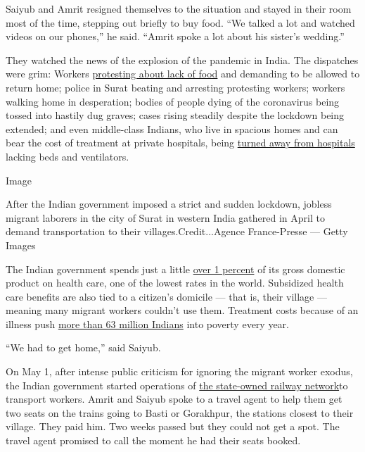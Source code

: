 Saiyub and Amrit resigned themselves to the situation and stayed in
their room most of the time, stepping out briefly to buy food. ``We
talked a lot and watched videos on our phones,'' he said. ``Amrit spoke
a lot about his sister's wedding.''

They watched the news of the explosion of the pandemic in India. The
dispatches were grim: Workers
\href{https://www.thehindu.com/news/national/other-states/migrant-workers-in-surat-take-to-the-streets-again/article31341846.ece}{protesting
about lack of food} and demanding to be allowed to return home; police
in Surat beating and arresting protesting workers; workers walking home
in desperation; bodies of people dying of the coronavirus being tossed
into hastily dug graves; cases rising steadily despite the lockdown
being extended; and even middle-class Indians, who live in spacious
homes and can bear the cost of treatment at private hospitals, being
\href{https://www.nytimes3xbfgragh.onion/2020/06/21/world/asia/coronavirus-india-hospitals-pregnant.html}{turned
away from hospitals} lacking beds and ventilators.

Image

After the Indian government imposed a strict and sudden lockdown,
jobless migrant laborers in the city of Surat in western India gathered
in April to demand transportation to their villages.Credit...Agence
France-Presse --- Getty Images

The Indian government spends just a little
\href{https://main.mohfw.gov.in/sites/default/files/NHA_Estimates_Report_2015-16_0.pdf}{over
1 percent} of its gross domestic product on health care, one of the
lowest rates in the world. Subsidized health care benefits are also tied
to a citizen's domicile --- that is, their village --- meaning many
migrant workers couldn't use them. Treatment costs because of an illness
push
\href{https://www.indiaspend.com/wp-content/uploads/2020/06/Draft_National_Hea_2263179a.pdf}{more
than 63 million Indians} into poverty every year.

``We had to get home,'' said Saiyub.

On May 1, after intense public criticism for ignoring the migrant worker
exodus, the Indian government started operations of
\href{https://timesofindia.indiatimes.com/videos/news/covid-19-lockdown-indian-railways-starts-first-special-train-for-migrant-workers-from-hyderabad-to-jharkhand/videoshow/75487379.cms}{the
state-owned railway network}to transport workers. Amrit and Saiyub spoke
to a travel agent to help them get two seats on the trains going to
Basti or Gorakhpur, the stations closest to their village. They paid
him. Two weeks passed but they could not get a spot. The travel agent
promised to call the moment he had their seats booked.

